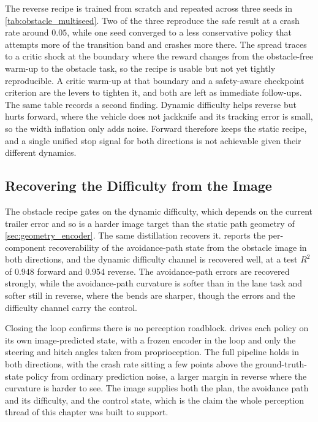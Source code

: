 The reverse recipe is trained from scratch and repeated across three seeds in \cref{tab:obstacle_multiseed}. Two of the three reproduce the safe result at a crash rate around $0.05$, while one seed converged to a less conservative policy that attempts more of the transition band and crashes more there. The spread traces to a critic shock at the boundary where the reward changes from the obstacle-free warm-up to the obstacle task, so the recipe is usable but not yet tightly reproducible. A critic warm-up at that boundary and a safety-aware checkpoint criterion are the levers to tighten it, and both are left as immediate follow-ups. The same table records a second finding. Dynamic difficulty helps reverse but hurts forward, where the vehicle does not jackknife and its tracking error is small, so the width inflation only adds noise. Forward therefore keeps the static recipe, and a single unified stop signal for both directions is not achievable given their different dynamics.



\subsection{Recovering the Difficulty from the Image}

The obstacle recipe gates on the dynamic difficulty, which depends on the current trailer error and so is a harder image target than the static path geometry of \cref{sec:geometry_encoder}. The same distillation recovers it.  reports the per-component recoverability of the avoidance-path state from the obstacle image in both directions, and the dynamic difficulty channel is recovered well, at a test $R^2$ of $0.948$ forward and $0.954$ reverse. The avoidance-path errors are recovered strongly, while the avoidance-path curvature is softer than in the lane task and softer still in reverse, where the bends are sharper, though the errors and the difficulty channel carry the control.



Closing the loop confirms there is no perception roadblock.  drives each policy on its own image-predicted state, with a frozen encoder in the loop and only the steering and hitch angles taken from proprioception. The full pipeline holds in both directions, with the crash rate sitting a few points above the ground-truth-state policy from ordinary prediction noise, a larger margin in reverse where the curvature is harder to see. The image supplies both the plan, the avoidance path and its difficulty, and the control state, which is the claim the whole perception thread of this chapter was built to support.


